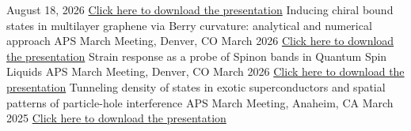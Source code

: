 \begin{cventries}
{August 18, 2026} %
{
}
\vspace{-1.5mm}
	\cventry
{\href{https://drive.google.com/file/d/1Kb1NMF32N2NyHCcRs3w9tzaEQapEs6Pq/view?usp=sharing}{Click \underline{here} to download the presentation}} %
{Inducing chiral bound states in multilayer graphene via Berry curvature: analytical and numerical approach} %
{APS March Meeting, Denver, CO} %
{March 2026} %
{
}
	\vspace{-1.5mm}
	\cventry
{\href{https://drive.google.com/file/d/1M9ZYelGdC6XFK0UXrOCgbMAPBTpB8OEN/view?usp=sharing}{Click \underline{here} to download the presentation}} %
{Strain response as a probe of Spinon bands in Quantum Spin Liquids} %
{APS March Meeting, Denver, CO} %
{March 2026} %
{
}
	\vspace{-1.5mm}
	\cventry
{\href{https://docs.google.com/presentation/d/1f8SEl4IGaiwtxBs2p6rBDYGDNy4f1wdE_IzeY7EPmKs/edit?usp=sharing}{Click \underline{here} to download the presentation}} %
{Tunneling density of states in exotic superconductors and spatial patterns of particle-hole interference} %
{APS March Meeting, Anaheim, CA} %
{March 2025} %
{
}
	\vspace{-1.5mm}
	\cventry
	{\href{https://drive.google.com/file/d/1OpPcqvn78Uffwwdk_xJLz_MCEl7bEjHX/view?usp=sharing}{Click \underline{here} to download the presentation}} %

\end{cventries}
